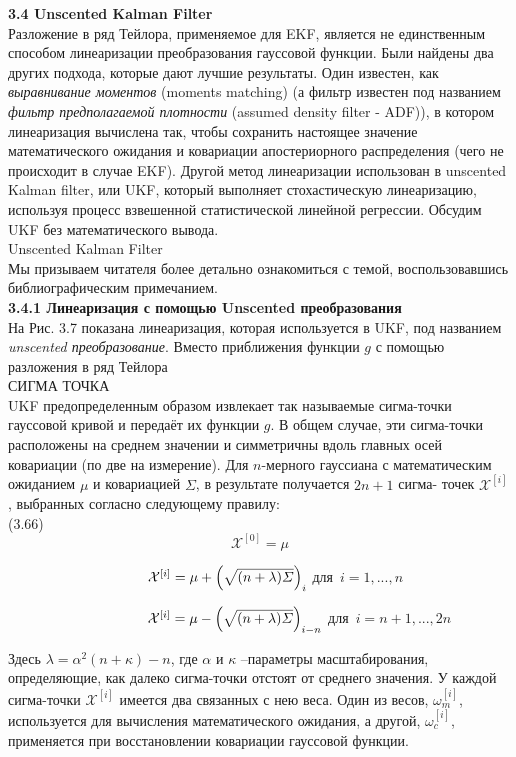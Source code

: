 \documentclass[10pt,a4paper]{article}
\begin{document}
\textbf{3.4 Unscented Kalman Filter}\\

Разложение в ряд Тейлора, применяемое для EKF, является не единственным способом линеаризации преобразования гауссовой функции. Были найдены два других подхода, которые дают лучшие результаты. Один известен, как \textit{выравнивание моментов} (moments matching) (а фильтр известен под названием \textit{фильтр предполагаемой плотности} (assumed density filter - ADF)), в котором линеаризация вычислена так, чтобы сохранить настоящее значение математического ожидания и ковариации апостериорного распределения (чего не происходит в случае EKF). Другой метод линеаризации использован в unscented Kalman filter, или UKF, который выполняет стохастическую линеаризацию, используя процесс взвешенной статистической линейной регрессии. Обсудим UKF без математического вывода.\\
Unscented Kalman Filter\\ 
Мы призываем читателя более детально ознакомиться с темой, воспользовавшись библиографическим примечанием.\\

\textbf{3.4.1 Линеаризация с помощью Unscented преобразования}\\

На Рис. 3.7 показана линеаризация, которая используется в UKF, под названием \textit{unscented преобразование}. Вместо приближения функции $g$ с помощью разложения в ряд Тейлора\\
СИГМА ТОЧКА\\
UKF предопределенным образом извлекает так называемые сигма-точки гауссовой кривой и передаёт их функции $g$. В общем случае, эти сигма-точки расположены на среднем значении и симметричны вдоль главных осей ковариации (по две на измерение). Для $n$-мерного гауссиана с математическим ожиданием $\mu$ и ковариацией $\varSigma$, в результате получается $2n + 1$ сигма- точек $\mathcal X^{[i]}$, выбранных согласно следующему правилу:\\

(3.66)
$$\mathcal X^{[0]}=\mu$$

$\hspace{35mm}\mathcal X^{[i]}=\mu+\left( \sqrt{(n+\lambda)\varSigma}\right) _{i}$ \qquad\mbox {для $i=1,...,n$} 

$\hspace{35mm}\mathcal X^{[i]}=\mu-\left( \sqrt{(n+\lambda)\varSigma}\right) _{i-n}$ \qquad\mbox {для $i=n+1,...,2n$}
 
Здесь $\lambda=\alpha^2(n+\kappa)-n$, где $\alpha$ и $\kappa$ –параметры масштабирования, определяющие, как далеко сигма-точки отстоят от среднего значения. У каждой сигма-точки $\mathcal X^{[i]}$ имеется два связанных с нею веса. Один из весов, $\omega_m^{[i]}$, используется для вычисления математического ожидания, а другой, $\omega_c^{[i]}$, применяется при восстановлении ковариации гауссовой функции.\\
\end{document}
